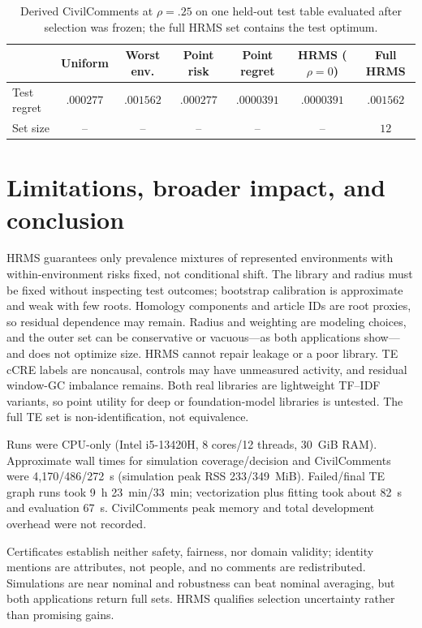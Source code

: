 \documentclass{article}
\begin{document}
\begin{table}[t]
\centering
\scriptsize
\caption{Derived CivilComments at $\rho=.25$ on one held-out test table evaluated after selection was frozen; the full HRMS set contains the test optimum.}
\label{tab:civil}
\setlength{\tabcolsep}{3pt}
\begin{tabular}{lcccccc}
\toprule
 & Uniform & Worst env. & Point risk & Point regret & HRMS ($\rho=0$) & Full HRMS \\
\midrule
Test regret & $.000277$ & $.001562$ & $.000277$ & $.0000391$ & $.0000391$ & $.001562$ \\
Set size & -- & -- & -- & -- & -- & $12$ \\
\bottomrule
\end{tabular}
\end{table}

\section{Limitations, broader impact, and conclusion}
\label{sec:limitations}

HRMS guarantees only prevalence mixtures of represented environments with within-environment risks fixed, not conditional shift.  The library and radius must be fixed without inspecting test outcomes; bootstrap calibration is approximate and weak with few roots.  Homology components and article IDs are root proxies, so residual dependence may remain.  Radius and weighting are modeling choices, and the outer set can be conservative or vacuous---as both applications show---and does not optimize size.  HRMS cannot repair leakage or a poor library.  TE cCRE labels are noncausal, controls may have unmeasured activity, and residual window-GC imbalance remains.  Both real libraries are lightweight TF--IDF variants, so point utility for deep or foundation-model libraries is untested.  The full TE set is non-identification, not equivalence.

Runs were CPU-only (Intel i5-13420H, 8 cores/12 threads, 30~GiB RAM).  Approximate wall times for simulation coverage/decision and CivilComments were 4,170/486/272~s (simulation peak RSS 233/349~MiB).  Failed/final TE graph runs took 9~h 23~min/33~min; vectorization plus fitting took about 82~s and evaluation 67~s.  CivilComments peak memory and total development overhead were not recorded.

Certificates establish neither safety, fairness, nor domain validity; identity mentions are attributes, not people, and no comments are redistributed.  Simulations are near nominal and robustness can beat nominal averaging, but both applications return full sets.  HRMS qualifies selection uncertainty rather than promising gains.

\clearpage




\end{document}
